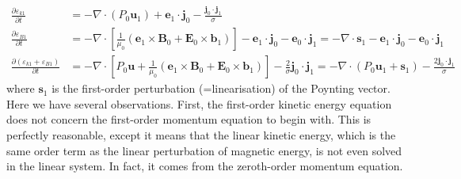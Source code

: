 \begin{equation}\begin{aligned}\label{eqn:energy-eqn-order1}
    \frac{\partial \varepsilon_{k1}}{\partial t} &= - \nabla\cdot(P_0\mathbf{u}_1) + \mathbf{e}_1 \cdot \mathbf{j}_0 - \frac{\mathbf{j}_0\cdot \mathbf{j}_1}{\sigma} \\ 
    \frac{\partial \varepsilon_{B1}}{\partial t} &= - \nabla\cdot \left[\frac{1}{\mu_0} \left(\mathbf{e}_1\times \mathbf{B}_0 + \mathbf{E}_0\times \mathbf{b}_1\right)\right] - \mathbf{e}_1\cdot \mathbf{j}_0 - \mathbf{e}_0\cdot \mathbf{j}_1 = - \nabla\cdot \mathbf{s}_1 - \mathbf{e}_1 \cdot \mathbf{j}_0 - \mathbf{e}_0\cdot \mathbf{j}_1 \\ 
    \frac{\partial (\varepsilon_{k1} + \varepsilon_{B1})}{\partial t} &= - \nabla\cdot \left[P_0 \mathbf{u} + \frac{1}{\mu_0} \left(\mathbf{e}_1\times \mathbf{B}_0 + \mathbf{E}_0\times \mathbf{b}_1\right)\right] - \frac{2}{\sigma} \mathbf{j}_0\cdot \mathbf{j}_1 = - \nabla\cdot (P_0 \mathbf{u}_1 + \mathbf{s}_1) - \frac{2\mathbf{j}_0\cdot \mathbf{j}_1}{\sigma}
\end{aligned}\end{equation}
%
where $\mathbf{s}_1$ is the first-order perturbation (=linearisation) of the Poynting vector.
Here we have several observations. First, the first-order kinetic energy equation does not concern the first-order momentum equation to begin with. This is perfectly reasonable, except it means that the linear kinetic energy, which is the same order term as the linear perturbation of magnetic energy, is not even solved in the linear system. In fact, it comes from the zeroth-order momentum equation.

